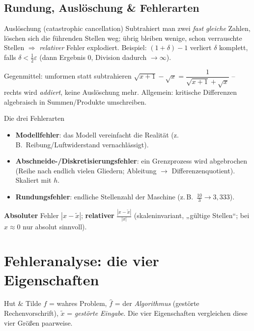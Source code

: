 \documentclass[a4paper,11pt]{article}
\begin{document}
\subsection{Rundung, Auslöschung \& Fehlerarten}
\begin{satz}{Auslöschung (catastrophic cancellation)}
Subtrahiert man zwei \emph{fast gleiche} Zahlen, löschen sich die führenden Stellen weg; übrig
bleiben wenige, schon verrauschte Stellen $\Rightarrow$ \emph{relativer} Fehler explodiert.
Beispiel: $(1+\delta)-1$ verliert $\delta$ komplett, falls $\delta<\tfrac12\varepsilon$
(dann Ergebnis $0$, Division dadurch $\to\infty$).
\end{satz}

\begin{intu}{Gegenmittel: umformen statt subtrahieren}
$\sqrt{x+1}-\sqrt{x}=\dfrac{1}{\sqrt{x+1}+\sqrt{x}}$ -- rechts wird \emph{addiert}, keine
Auslöschung mehr. Allgemein: kritische Differenzen algebraisch in Summen/Produkte umschreiben.
\end{intu}

\begin{defi}{Die drei Fehlerarten}
\begin{itemize}
\item \textbf{Modellfehler}: das Modell vereinfacht die Realität (z.\,B.\ Reibung/Luftwiderstand vernachlässigt).
\item \textbf{Abschneide-/Diskretisierungsfehler}: ein Grenzprozess wird abgebrochen
  (Reihe nach endlich vielen Gliedern; Ableitung $\to$ Differenzenquotient). Skaliert mit $h$.
\item \textbf{Rundungsfehler}: endliche Stellenzahl der Maschine (z.\,B.\ $\tfrac{10}{3}\to 3{,}333$).
\end{itemize}
\textbf{Absoluter} Fehler $|x-\tilde x|$; \textbf{relativer} $\frac{|x-\tilde x|}{|x|}$
(skaleninvariant, „gültige Stellen``; bei $x\approx0$ nur absolut sinnvoll).
\end{defi}

\section{Fehleranalyse: die vier Eigenschaften}

\begin{intu}{Hut \& Tilde}
$f$ = wahres Problem, $\hat f$ = der \emph{Algorithmus} (gestörte Rechenvorschrift),
$\tilde x$ = \emph{gestörte Eingabe}. Die vier Eigenschaften vergleichen diese vier Größen
paarweise.
\end{intu}
\end{document}
